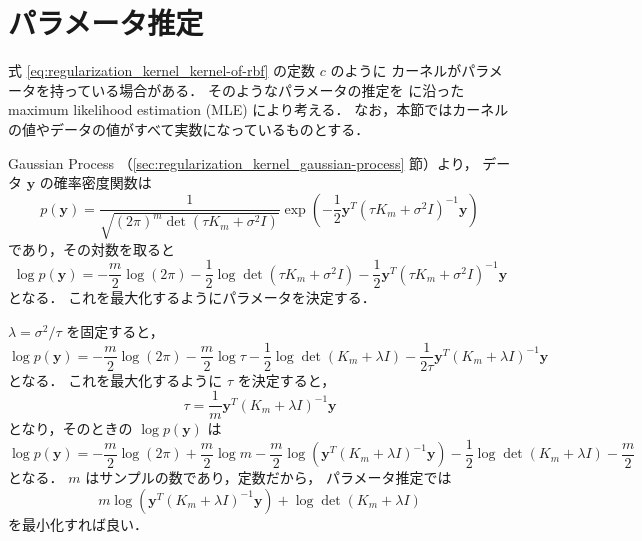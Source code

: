 \section{パラメータ推定}\label{sec:regularization_kernel_param-est}

式 \eqref{eq:regularization_kernel_kernel-of-rbf} の定数 $c$ のように
カーネルがパラメータを持っている場合がある．
そのようなパラメータの推定を
\cite[Remark 3 (Connection to spatial statistics)]{Scheuerer2011}
に沿った
maximum likelihood estimation (MLE)
により考える．
なお，本節ではカーネルの値やデータの値がすべて実数になっているものとする．

Gaussian Process （\ref{sec:regularization_kernel_gaussian-process} 節）より，
データ $\bm{y}$ の確率密度関数は
\begin{equation}
    p(\bm{y}) = \frac{1}{\sqrt{(2\pi)^{m} \det(\tau K_m + \sigma^2 I)}}
    \exp\left(-\frac{1}{2} \bm{y}^T (\tau K_m + \sigma^2 I)^{-1} \bm{y} \right)
\end{equation}
であり，その対数を取ると
\begin{equation}
    \log{p(\bm{y})}
    = -\frac{m}{2}\log(2\pi)
    - \frac{1}{2} \log{\det(\tau K_m + \sigma^2 I)}
    - \frac{1}{2} \bm{y}^T (\tau K_m + \sigma^2 I)^{-1} \bm{y}
\end{equation}
となる．
これを最大化するようにパラメータを決定する．

$\lambda = \sigma^2 / \tau$ を固定すると，
\begin{equation}
    \log{p(\bm{y})}
    = -\frac{m}{2}\log(2\pi)
    - \frac{m}{2} \log{\tau}
    - \frac{1}{2} \log{\det(K_m + \lambda I)}
    - \frac{1}{2\tau} \bm{y}^T (K_m + \lambda I)^{-1} \bm{y}
\end{equation}
となる．
これを最大化するように $\tau$ を決定すると，
\begin{equation}
    \tau = \frac{1}{m} \bm{y}^T (K_m + \lambda I)^{-1} \bm{y}
    \label{eq:interp_kernel_param_coeff_tau}
\end{equation}
となり，そのときの $\log{p(\bm{y})}$ は
\begin{equation}
    \log{p(\bm{y})}
    = -\frac{m}{2}\log(2\pi)
    + \frac{m}{2} \log{m}
    - \frac{m}{2} \log(\bm{y}^T (K_m + \lambda I)^{-1} \bm{y})
    - \frac{1}{2} \log{\det(K_m + \lambda I)}
    - \frac{m}{2}
\end{equation}
となる．
$m$ はサンプルの数であり，定数だから，
パラメータ推定では
\begin{equation}
    m \log(\bm{y}^T (K_m + \lambda I)^{-1} \bm{y})
    + \log{\det(K_m + \lambda I)}
\end{equation}
を最小化すれば良い．

